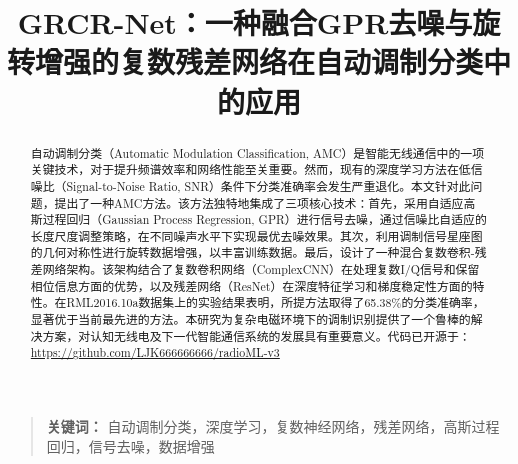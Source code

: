 \documentclass{article}
\newenvironment{keywords}{\begin{quote}\textbf{关键词：}}{\end{quote}}
\begin{document}
\sloppy

\title{GRCR-Net：一种融合GPR去噪与旋转增强的复数残差网络在自动调制分类中的应用}


\maketitle

\begin{abstract}
自动调制分类（Automatic Modulation Classification, AMC）是智能无线通信中的一项关键技术，对于提升频谱效率和网络性能至关重要。然而，现有的深度学习方法在低信噪比（Signal-to-Noise Ratio, SNR）条件下分类准确率会发生严重退化。本文针对此问题，提出了一种AMC方法。该方法独特地集成了三项核心技术：首先，采用自适应高斯过程回归（Gaussian Process Regression, GPR）进行信号去噪，通过信噪比自适应的长度尺度调整策略，在不同噪声水平下实现最优去噪效果。其次，利用调制信号星座图的几何对称性进行旋转数据增强，以丰富训练数据。最后，设计了一种混合复数卷积-残差网络架构。该架构结合了复数卷积网络（ComplexCNN）在处理复数I/Q信号和保留相位信息方面的优势，以及残差网络（ResNet）在深度特征学习和梯度稳定性方面的特性。在RML2016.10a数据集上的实验结果表明，所提方法取得了65.38\%的分类准确率，显著优于当前最先进的方法。本研究为复杂电磁环境下的调制识别提供了一个鲁棒的解决方案，对认知无线电及下一代智能通信系统的发展具有重要意义。代码已开源于：\url{https://github.com/LJK666666666/radioML-v3}
\end{abstract}

\begin{keywords}
自动调制分类，深度学习，复数神经网络，残差网络，高斯过程回归，信号去噪，数据增强
\end{keywords}

\end{document}
